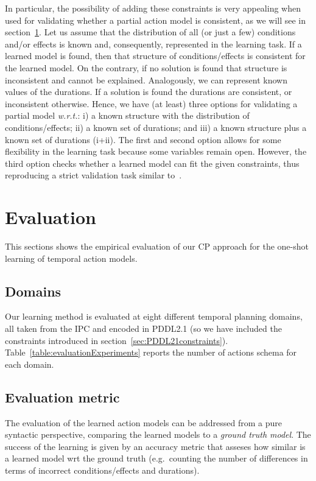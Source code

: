 \documentclass[runningheads]{llncs}
\begin{document}
In particular, the possibility of adding these constraints is very appealing when used for validating whether a partial action model is consistent, as we will see in section~\ref{sec:evaluation}.
Let us assume that the distribution of all (or just a few) conditions and/or effects is known and, consequently, represented in the learning task. If a learned model is found, then that structure of conditions/effects is consistent for the learned model. On the contrary, if no solution is found that structure is inconsistent and cannot be explained.
Analogously, we can represent known values of the durations. If a solution is found the durations are consistent, or inconsistent otherwise.
Hence, we have (at least) three options for validating a partial model \emph{w.r.t.}: i) a known structure with the distribution of conditions/effects; ii) a known set of durations; and iii) a known structure plus a known set of durations (i+ii).
The first and second option allows for some flexibility in the learning task because some variables remain open. However, the third option checks whether a learned model can fit the given constraints, thus reproducing a strict validation task similar to~\cite{howey2004val}.



\section{Evaluation}
\label{sec:evaluation}
This sections shows the empirical evaluation of our CP approach for the one-shot learning of temporal action models.

\subsection{Domains}
Our learning method is evaluated at eight different temporal planning domains, all taken from the IPC and encoded in PDDL2.1 (so we have included the constraints introduced in section~\ref{sec:PDDL21constraints}). Table~\ref{table:evaluationExperiments} reports the number of actions schema for each domain.

\subsection{Evaluation metric}
The evaluation of the learned action models can be addressed from a pure syntactic perspective, comparing the learned models to a {\em ground truth model}. The success of the learning is given by an accuracy metric that asseses how similar is a learned model wrt the ground truth (e.g.~counting the number of differences in terms of incorrect conditions/effects and durations).
\end{document}
